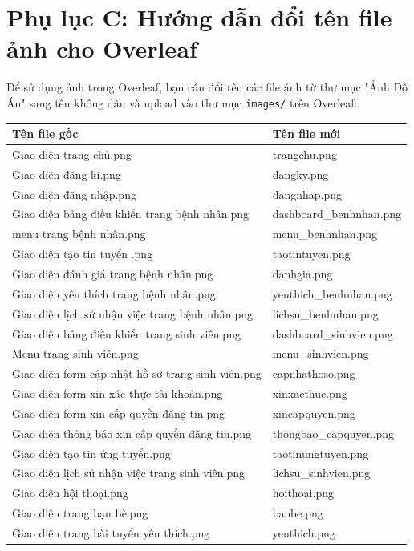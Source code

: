\documentclass[a4paper,13pt]{extreport}
\begin{document}
\section*{Phụ lục C: Hướng dẫn đổi tên file ảnh cho Overleaf}

Để sử dụng ảnh trong Overleaf, bạn cần đổi tên các file ảnh từ thư mục "Ảnh Đồ Án" sang tên không dấu và upload vào thư mục \texttt{images/} trên Overleaf:

\begin{table}[H]
\centering
\small
\begin{tabular}{|l|l|}
\hline
\textbf{Tên file gốc} & \textbf{Tên file mới} \\
\hline
Giao diện trang chủ.png & trangchu.png \\
Giao diện đăng kí.png & dangky.png \\
Giao diện đăng nhập.png & dangnhap.png \\
Giao diện bảng điều khiển trang bệnh nhân.png & dashboard\_benhnhan.png \\
menu trang bệnh nhân.png & menu\_benhnhan.png \\
Giao diện tạo tin tuyển .png & taotintuyen.png \\
Giao diện đánh giá trang bệnh nhân.png & danhgia.png \\
Giao diện yêu thích trang bệnh nhân.png & yeuthich\_benhnhan.png \\
Giao diện lịch sử nhận việc trang bệnh nhân.png & lichsu\_benhnhan.png \\
Giao diện bảng điều khiển trang sinh viên.png & dashboard\_sinhvien.png \\
Menu trang sinh viên.png & menu\_sinhvien.png \\
Giao diện form cập nhật hồ sơ trang sinh viên.png & capnhathoso.png \\
Giao diện form xin xác thực tài khoản.png & xinxacthuc.png \\
Giao diện form xin cấp quyền đăng tin.png & xincapquyen.png \\
Giao diện thông báo xin cấp quyền đăng tin.png & thongbao\_capquyen.png \\
Giao diện tạo tin ứng tuyển.png & taotinungtuyen.png \\
Giao diện lịch sử nhận việc trang sinh viên.png & lichsu\_sinhvien.png \\
Giao diện hội thoại.png & hoithoai.png \\
Giao diện trang bạn bè.png & banbe.png \\
Giao diện trang bài tuyển yêu thích.png & yeuthich.png \\

\end{tabular}
\end{table}
\end{document}
